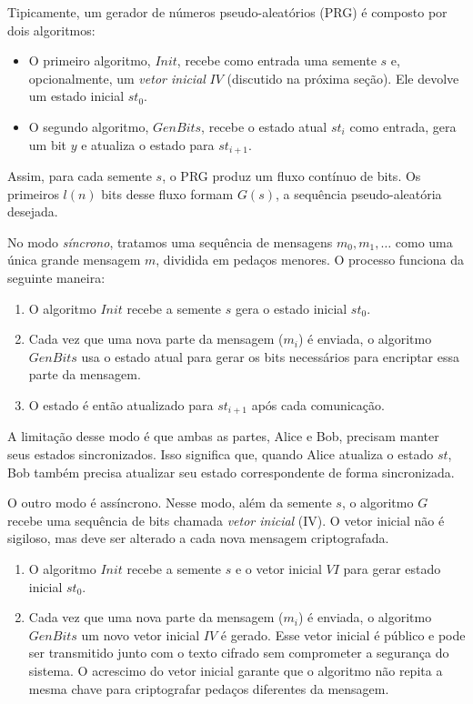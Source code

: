 Tipicamente, um gerador de números pseudo-aleatórios (PRG) é composto por dois algoritmos: 
\begin{itemize}
\item O primeiro algoritmo, $Init$, recebe como entrada uma semente $s$ e, opcionalmente, um {\em vetor inicial} $IV$ (discutido na próxima seção).
  Ele devolve um estado inicial $st_0$.
\item  O segundo algoritmo, $GenBits$, recebe o estado atual $st_i$ como entrada, gera um bit $y$ e atualiza o estado para $st_{i+1}$.
\end{itemize}

Assim, para cada semente $s$, o PRG produz um fluxo contínuo de bits.
Os primeiros $l(n)$ bits desse fluxo formam $G(s)$, a sequência pseudo-aleatória desejada.

No modo \textit{síncrono}, tratamos uma sequência de mensagens $m_0, m_1, \dots$ como uma única grande mensagem $m$, dividida em pedaços menores.
O processo funciona da seguinte maneira:

\begin{enumerate}
    \item O algoritmo $Init$ recebe a semente $s$ gera o estado inicial $st_0$.
    \item Cada vez que uma nova parte da mensagem ($m_i$) é enviada, o algoritmo $GenBits$ usa o estado atual para gerar os bits necessários para encriptar essa parte da mensagem.
    \item O estado é então atualizado para $st_{i+1}$ após cada comunicação.
\end{enumerate}

A limitação desse modo é que ambas as partes, Alice e Bob, precisam manter seus estados sincronizados.
Isso significa que, quando Alice atualiza o estado $st$, Bob também precisa atualizar seu estado correspondente de forma sincronizada.

O outro modo é assíncrono. Nesse modo, além da semente $s$, o algoritmo $G$ recebe uma sequência de bits chamada {\em vetor inicial} (IV).
O vetor inicial não é sigiloso, mas deve ser alterado a cada nova mensagem criptografada.

\begin{enumerate}
    \item O algoritmo $Init$ recebe a semente $s$ e o vetor inicial $VI$ para gerar estado inicial $st_0$.
    \item Cada vez que uma nova parte da mensagem ($m_i$) é enviada, o algoritmo $GenBits$ um novo vetor inicial $IV$ é gerado.
      Esse vetor inicial é público e pode ser transmitido junto com o texto cifrado sem comprometer a segurança do sistema.
      O acrescimo do vetor inicial garante que o algoritmo não repita a mesma chave para criptografar pedaços diferentes da mensagem.
\end{enumerate}


